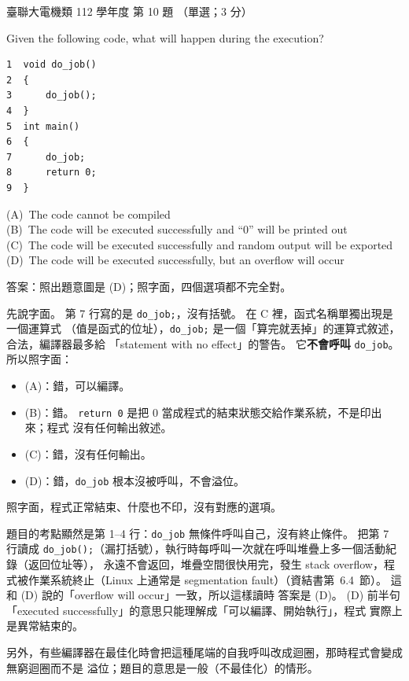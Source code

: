 \begin{pastexam}[label={px:ust-112-ee-ds-10}]{臺聯大電機類 112 學年度 第 10 題}
（單選；3 分）

Given the following code, what will happen during the execution?
\begin{lstlisting}[basicstyle=\ttfamily\small, frame=single, columns=fullflexible,
    keepspaces=true, xleftmargin=6em, xrightmargin=6em]
1  void do_job()
2  {
3      do_job();
4  }
5  int main()
6  {
7      do_job;
8      return 0;
9  }
\end{lstlisting}
(A)~The code cannot be compiled\\
(B)~The code will be executed successfully and ``0'' will be printed out\\
(C)~The code will be executed successfully and random output will be exported\\
(D)~The code will be executed successfully, but an overflow will occur
\end{pastexam}

\begin{pastsoln}
答案：照出題意圖是 (D)；照字面，四個選項都不完全對。

先說字面。 第 7 行寫的是 \texttt{do\_job;}，沒有括號。 在 C 裡，函式名稱單獨出現是一個運算式
（值是函式的位址），\texttt{do\_job;} 是一個「算完就丟掉」的運算式敘述，合法，編譯器最多給
「statement with no effect」的警告。 它\textbf{不會呼叫} \texttt{do\_job}。 所以照字面：
\begin{itemize}
\item (A)：錯，可以編譯。
\item (B)：錯。 \texttt{return 0} 是把 $0$ 當成程式的結束狀態交給作業系統，不是印出來；程式
沒有任何輸出敘述。
\item (C)：錯，沒有任何輸出。
\item (D)：錯，\texttt{do\_job} 根本沒被呼叫，不會溢位。
\end{itemize}
照字面，程式正常結束、什麼也不印，沒有對應的選項。

題目的考點顯然是第 1--4 行：\texttt{do\_job} 無條件呼叫自己，沒有終止條件。 把第 7 行讀成
\texttt{do\_job();}（漏打括號），執行時每呼叫一次就在呼叫堆疊上多一個活動紀錄（返回位址等），
永遠不會返回，堆疊空間很快用完，發生 stack overflow，程式被作業系統終止（Linux 上通常是
segmentation fault）（資結書第~6.4~節）。 這和 (D) 說的「overflow will occur」一致，所以這樣讀時
答案是 (D)。 (D) 前半句「executed successfully」的意思只能理解成「可以編譯、開始執行」，程式
實際上是異常結束的。

另外，有些編譯器在最佳化時會把這種尾端的自我呼叫改成迴圈，那時程式會變成無窮迴圈而不是
溢位；題目的意思是一般（不最佳化）的情形。
\end{pastsoln}
